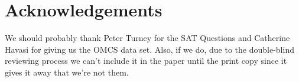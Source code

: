 \documentclass[11pt]{article}
\begin{document}
\section{Acknowledgements}

We should probably thank Peter Turney for the SAT Questions and Catherine Havasi
for giving us the OMCS data set.  Also, if we do, due to the double-blind
reviewing process we can't include it in the paper until the print copy since it
gives it away that we're not them.



\end{document}
